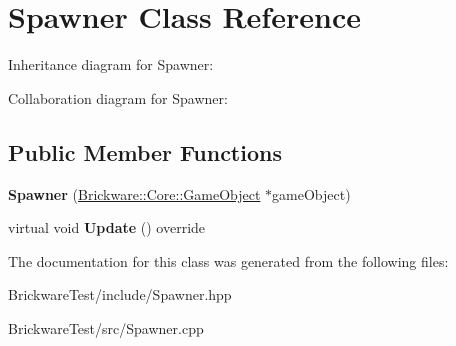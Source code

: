 \hypertarget{classSpawner}{}\section{Spawner Class Reference}
\label{classSpawner}


Inheritance diagram for Spawner\+:


Collaboration diagram for Spawner\+:
\subsection*{Public Member Functions}
\begin{DoxyCompactItemize}
\item 
\hypertarget{classSpawner_a78c868b37384d80db0ab53b877733699}{}{\bfseries Spawner} (\hyperlink{classBrickware_1_1Core_1_1GameObject}{Brickware\+::\+Core\+::\+Game\+Object} $\ast$game\+Object)\label{classSpawner_a78c868b37384d80db0ab53b877733699}

\item 
\hypertarget{classSpawner_aa4b02ba3e10944e69c24650b6bc9275d}{}virtual void {\bfseries Update} () override\label{classSpawner_aa4b02ba3e10944e69c24650b6bc9275d}

\end{DoxyCompactItemize}


The documentation for this class was generated from the following files\+:\begin{DoxyCompactItemize}
\item 
Brickware\+Test/include/Spawner.\+hpp\item 
Brickware\+Test/src/Spawner.\+cpp\end{DoxyCompactItemize}
